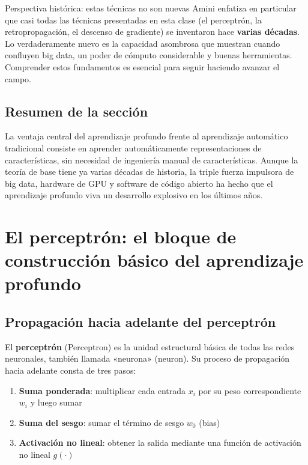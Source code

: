 \documentclass[a4paper]{article}
\begin{document}
\begin{knowledgebox}{Perspectiva histórica: estas técnicas no son nuevas}
Amini enfatiza en particular que casi todas las técnicas presentadas en esta clase (el perceptrón, la retropropagación, el descenso de gradiente) se inventaron hace \textbf{varias décadas}. Lo verdaderamente nuevo es la capacidad asombrosa que muestran cuando confluyen big data, un poder de cómputo considerable y buenas herramientas. Comprender estos fundamentos es esencial para seguir haciendo avanzar el campo.
\end{knowledgebox}

\subsection{Resumen de la sección}

La ventaja central del aprendizaje profundo frente al aprendizaje automático tradicional consiste en aprender automáticamente representaciones de características, sin necesidad de ingeniería manual de características. Aunque la teoría de base tiene ya varias décadas de historia, la triple fuerza impulsora de big data, hardware de GPU y software de código abierto ha hecho que el aprendizaje profundo viva un desarrollo explosivo en los últimos años.

\section{El perceptrón: el bloque de construcción básico del aprendizaje profundo}

\subsection{Propagación hacia adelante del perceptrón}

El \textbf{perceptrón} (Perceptron) es la unidad estructural básica de todas las redes neuronales, también llamada «neurona» (neuron). Su proceso de propagación hacia adelante consta de tres pasos:

\begin{enumerate}
\item \textbf{Suma ponderada}: multiplicar cada entrada $x_i$ por su peso correspondiente $w_i$ y luego sumar
\item \textbf{Suma del sesgo}: sumar el término de sesgo $w_0$ (bias)
\item \textbf{Activación no lineal}: obtener la salida mediante una función de activación no lineal $g(\cdot)$
\end{enumerate}
\end{document}

